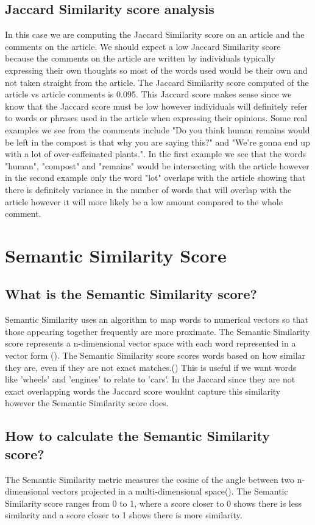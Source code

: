 \documentclass{article}
\begin{document}
\subsection{Jaccard Similarity score analysis}
In this case we are computing the Jaccard Similarity score on an article and the comments on the article. We should expect a low Jaccard Similarity score because the comments on the article are written by individuals typically expressing their own thoughts so most of the words used would be their own and not taken straight from the article. The Jaccard Similarity score computed of the article vs article comments is 0.095. This Jaccard score makes sense since we know that the Jaccard score must be low however individuals will definitely refer to words or phrases used in the article when expressing their opinions. Some real examples we see from the comments include "Do you think human remains would be left in the compost is that why you are saying this?" and "We're gonna end up with a lot of over-caffeinated plants.". In the first example we see that the words "human", "compost" and "remains" would be intersecting with the article however in the second example only the word "lot" overlaps with the article showing that there is definitely variance in the number of words that will overlap with the article however it will more likely be a low amount compared to the whole comment.

\section{Semantic Similarity Score}
\subsection{What is the Semantic Similarity score?}
Semantic Similarity uses an algorithm to map words to numerical vectors so that those appearing together frequently are more proximate. The Semantic Similarity score represents a n-dimensional vector space with each word represented in a vector form (\cite{Majumdar_2022}). The Semantic Similarity score scores words based on how similar they are, even if they are not exact matches.(\cite{Thomas_2020}) This is useful if we want words like 'wheels' and 'engines' to relate to 'cars'. In the Jaccard since they are not exact overlapping words the Jaccard score wouldnt capture this similarity however the Semantic Similarity score does.

\subsection{How to calculate the Semantic Similarity score?}
The Semantic Similarity metric measures the cosine of the angle between two n-dimensional vectors projected in a multi-dimensional space(\cite{Majumdar_2022}). The Semantic Similarity score ranges from 0 to 1, where a score closer to 0 shows there is less similarity and a score closer to 1 shows there is more similarity.
\end{document}
